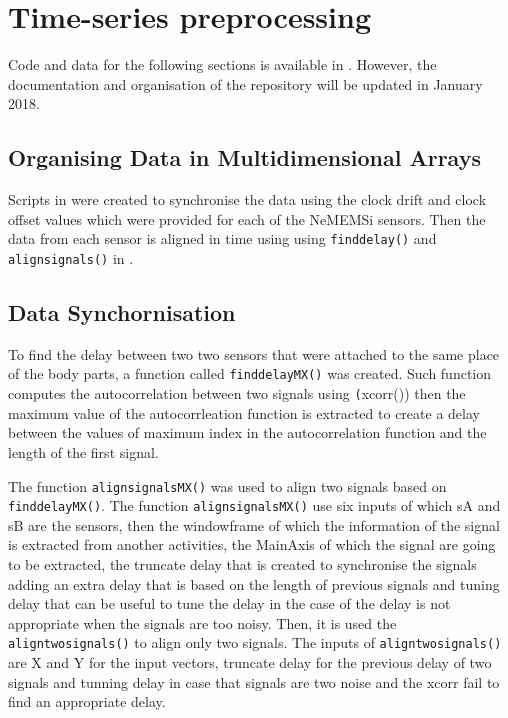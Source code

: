 \section{Time-series preprocessing}

Code and data for the following sections is available in 
\citep{hwum2018}. However, the documentation and organisation of the 
repository will be updated in January 2018.

\subsection{Organising Data in Multidimensional Arrays}
Scripts in \MATLAB were created to synchronise the data using the clock 
drift and clock offset values which were provided for each of the 
NeMEMSi sensors. Then the data from each sensor is aligned in 
time using using \texttt{finddelay()} and \texttt{alignsignals()} 
in \MATLAB.

\subsection{Data Synchornisation}
To find the delay between two two sensors that were attached to the same place
of the body parts, a function called  \texttt{finddelayMX()} was created.
Such function computes the autocorrelation between two signals using 
\texttt(xcorr())
then the maximum value of the autocorrleation function is extracted
to create a delay between the values of maximum index in the autocorrelation
function and the length of the first signal.

The function \texttt{alignsignalsMX()} was used to align two signals based
on \texttt{finddelayMX()}. The function \texttt{alignsignalsMX()} use six inputs
of which sA and sB are the sensors, then the windowframe of which the information
of the signal is extracted from another activities, the MainAxis of which the
signal are going to be extracted, the truncate delay that is created to
synchronise the signals adding an extra delay that is based on the length of
previous signals and tuning delay that can be useful to tune the delay in the
case of the delay is not appropriate when the signals are too noisy.
Then, it is used the \texttt{aligntwosignals()} to align only two signals.
The inputs of \texttt{aligntwosignals()} are X and Y for the input vectors,
truncate delay for the previous delay of two signals and tunning delay
in case that signals are two noise and the xcorr fail to find an appropriate
delay.

